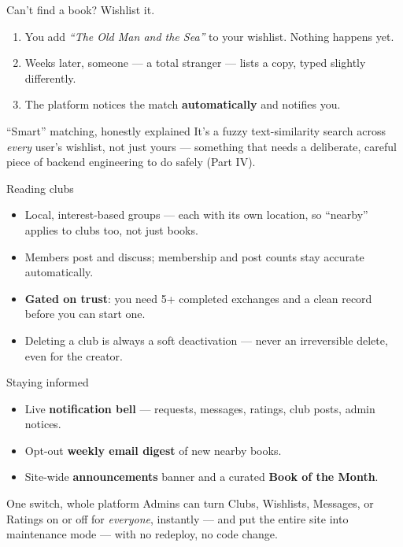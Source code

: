 \documentclass[aspectratio=169,11pt]{beamer}
\begin{document}
\begin{frame}{Can't find a book? Wishlist it.}
  \begin{enumerate}
    \item You add \emph{``The Old Man and the Sea''} to your wishlist. Nothing happens yet.
    \item Weeks later, someone --- a total stranger --- lists a copy, typed slightly differently.
    \item The platform notices the match \textbf{automatically} and notifies you.
  \end{enumerate}
  \vfill
  \begin{block}{``Smart'' matching, honestly explained}
    It's a fuzzy text-similarity search across \emph{every} user's wishlist, not just yours --- something that needs a deliberate, careful piece of backend engineering to do safely (Part IV).
  \end{block}
\end{frame}

\begin{frame}{Reading clubs}
  \begin{itemize}
    \item Local, interest-based groups --- each with its own location, so ``nearby'' applies to clubs too, not just books.
    \item Members post and discuss; membership and post counts stay accurate automatically.
    \item \textbf{Gated on trust}: you need 5+ completed exchanges and a clean record before you can start one.
    \item Deleting a club is always a soft deactivation --- never an irreversible delete, even for the creator.
  \end{itemize}
\end{frame}

\begin{frame}{Staying informed}
  \begin{itemize}
    \item Live \textbf{notification bell} --- requests, messages, ratings, club posts, admin notices.
    \item Opt-out \textbf{weekly email digest} of new nearby books.
    \item Site-wide \textbf{announcements} banner and a curated \textbf{Book of the Month}.
  \end{itemize}
  \vfill
  \begin{exampleblock}{One switch, whole platform}
    Admins can turn Clubs, Wishlists, Messages, or Ratings on or off for \emph{everyone}, instantly --- and put the entire site into maintenance mode --- with no redeploy, no code change.
  \end{exampleblock}
\end{frame}
\end{document}
